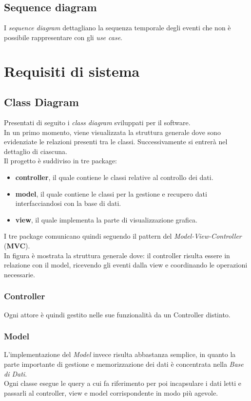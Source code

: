 \documentclass[a4paper]{article}
\begin{document}
\subsection{Sequence diagram}
I \textit{sequence diagram} dettagliano la sequenza temporale degli eventi che non è possibile rappresentare con gli \textit{use case}.
\\ [0.5cm]

\newpage

\section{Requisiti di sistema}
\subsection{Class Diagram} %
Presentati di seguito i \textit{class diagram} sviluppati per il software.\\
In un primo momento, viene visualizzata la struttura generale dove sono evidenziate le relazioni presenti tra le classi. Successivamente si entrer\`a nel dettaglio di ciascuna.\\
Il progetto \`e suddiviso in tre package:
\begin{itemize}
	\item \textbf{controller}, il quale contiene le classi relative al controllo dei dati.
	\item \textbf{model}, il quale contiene le classi per la gestione e recupero dati interfacciandosi con la base di dati.
	\item \textbf{view}, il quale implementa la parte di visualizzazione grafica.
\end{itemize}
I tre package comunicano quindi seguendo il pattern del \textit{Model-View-Controller} (\textbf{MVC}). \\
In figura è mostrata la struttura generale dove: il controller risulta essere in relazione con il model, ricevendo gli eventi dalla view e coordinando le operazioni necessarie.\\[0.5cm]

\subsubsection{Controller}
Ogni attore è quindi gestito nelle sue funzionalit\`a da un Controller distinto. \\ 

\newpage

\subsubsection{Model}
L'implementazione del \textit{Model} invece risulta abbastanza semplice, in quanto la parte importante di gestione e memorizzazione dei dati è concentrata nella \textit{Base di Dati}.\\
Ogni classe esegue le query a cui fa riferimento per poi incapsulare i dati letti e passarli al controller, view e model corrispondente in modo più agevole.\\
\end{document}
